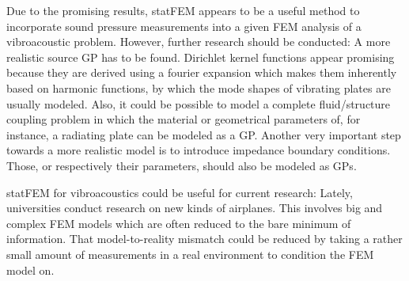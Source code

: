 \documentclass[%
  a4paper,oneside,%
  11pt,%
  smallchapters,
  style=printdev,
  extramargin,
  green,%
  rgb, <cmyk>
  ]{tubsbook}
\begin{document}
Due to the promising results, statFEM appears to be a useful method to incorporate sound pressure measurements into a given FEM analysis of a vibroacoustic problem. However, further research should be conducted: A more realistic source GP has to be found. Dirichlet kernel functions appear promising because they are derived using a fourier expansion which makes them inherently based on harmonic functions, by which the mode shapes of vibrating plates are usually modeled. Also, it could be possible to model a complete fluid/structure coupling problem in which the material or geometrical parameters of, for instance, a radiating plate can be modeled as a GP. Another very important step towards a more realistic model is to introduce impedance boundary conditions. Those, or respectively their parameters, should also be modeled as GPs. 

statFEM for vibroacoustics could be useful for current research: Lately, universities conduct research on new kinds of airplanes. This involves big and complex FEM models which are often reduced to the bare minimum of information. That model-to-reality mismatch could be reduced by taking a rather small amount of measurements in a real environment to condition the FEM model on. 



\printbibliography


%


\end{document}
